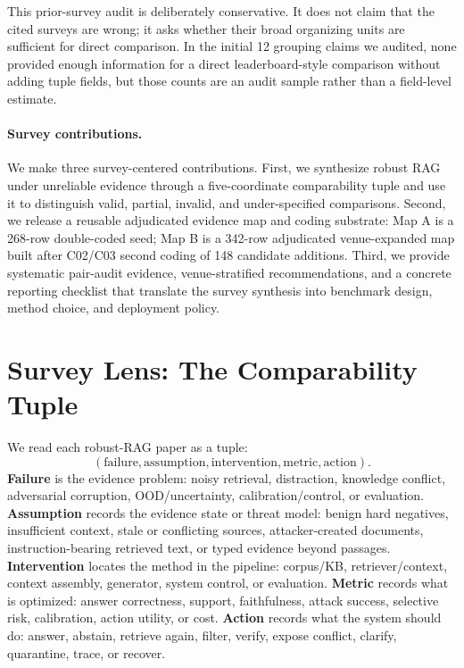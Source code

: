 \documentclass[11pt]{article}
\begin{document}


This prior-survey audit is deliberately conservative. It does not claim that the cited surveys are wrong; it asks whether their broad organizing units are sufficient for direct comparison. In the initial 12 grouping claims we audited, none provided enough information for a direct leaderboard-style comparison without adding tuple fields, but those counts are an audit sample rather than a field-level estimate.

\paragraph{Survey contributions.}
We make three survey-centered contributions. First, we synthesize robust RAG under unreliable evidence through a five-coordinate comparability tuple and use it to distinguish valid, partial, invalid, and under-specified comparisons. Second, we release a reusable adjudicated evidence map and coding substrate: Map A is a 268-row double-coded seed; Map B is a 342-row adjudicated venue-expanded map built after C02/C03 second coding of 148 candidate additions. Third, we provide systematic pair-audit evidence, venue-stratified recommendations, and a concrete reporting checklist that translate the survey synthesis into benchmark design, method choice, and deployment policy.

\section{Survey Lens: The Comparability Tuple}
\label{sec:framework-first}

We read each robust-RAG paper as a tuple:
\[
(\text{failure}, \text{assumption}, \text{intervention}, \text{metric}, \text{action}).
\]
\textbf{Failure} is the evidence problem: noisy retrieval, distraction, knowledge conflict, adversarial corruption, OOD/uncertainty, calibration/control, or evaluation. \textbf{Assumption} records the evidence state or threat model: benign hard negatives, insufficient context, stale or conflicting sources, attacker-created documents, instruction-bearing retrieved text, or typed evidence beyond passages. \textbf{Intervention} locates the method in the pipeline: corpus/KB, retriever/context, context assembly, generator, system control, or evaluation. \textbf{Metric} records what is optimized: answer correctness, support, faithfulness, attack success, selective risk, calibration, action utility, or cost. \textbf{Action} records what the system should do: answer, abstain, retrieve again, filter, verify, expose conflict, clarify, quarantine, trace, or recover.
\end{document}
